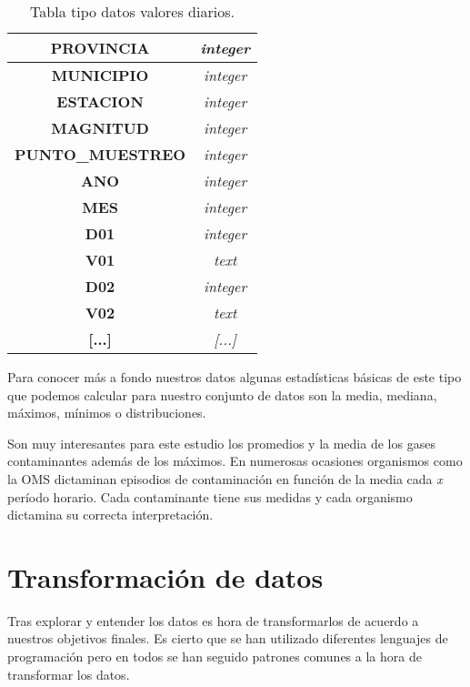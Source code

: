 \begin{table}[H]
	\begin{center}
		\begin{tabular}{|c|c|}
			\hline
			\textbf{PROVINCIA}       & \textit{integer}              \\ \hline
			\textbf{MUNICIPIO}       & \textit{integer}              \\ \hline
			\textbf{ESTACION}        & \textit{integer}               \\ \hline
			\textbf{MAGNITUD}        & \textit{integer}               \\ \hline
			\textbf{PUNTO\_MUESTREO} & \textit{integer} \\ \hline
			\textbf{ANO}             & \textit{integer}            \\ \hline
			\textbf{MES}             & \textit{integer}               \\ \hline
			\textbf{D01}             & \textit{integer}              \\ \hline
			\textbf{V01}             & \textit{text}               \\ \hline
			\textbf{D02}             & \textit{integer}              \\ \hline
			\textbf{V02}             & \textit{text}               \\ \hline
			\textbf{[...]}             & \textit{[...]}               \\ \hline
		\end{tabular}
		\caption{Tabla tipo datos valores diarios.}
	\end{center}
\end{table}

Para conocer más a fondo nuestros datos algunas estadísticas básicas de este tipo que podemos calcular para nuestro conjunto de datos son la media, mediana, máximos, mínimos o distribuciones. 


Son muy interesantes para este estudio los promedios y la media de los gases contaminantes además de los máximos. En numerosas ocasiones organismos como la OMS \cite{oms_1} dictaminan episodios de contaminación en función de la media cada \textit{x} período horario. Cada contaminante tiene sus medidas y cada organismo dictamina su correcta interpretación.

 
\section{Transformación de datos}
Tras explorar y entender los datos es hora de transformarlos de acuerdo a nuestros objetivos finales. Es cierto que se han utilizado diferentes lenguajes de programación pero en todos se han seguido patrones comunes a la hora de transformar los datos.


